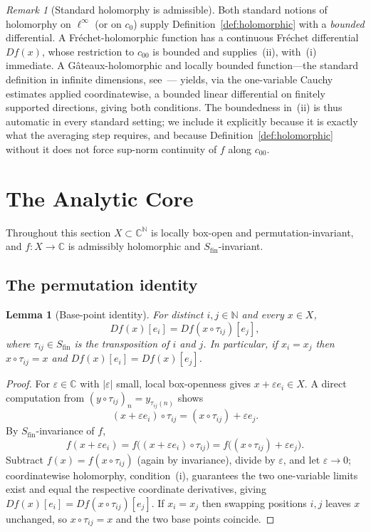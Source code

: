 \documentclass[11pt]{amsart}
\newcommand{\NN}{\mathbb{N}}
\newcommand{\CC}{\mathbb{C}}
\newcommand{\Sfin}{S_{\mathrm{fin}}}
\newcommand{\cc}{c_{00}}
\newcommand{\czero}{c_{0}}
\theoremstyle{plain}
\newtheorem{lemma}[theorem]{Lemma}
\theoremstyle{definition}
\theoremstyle{remark}
\newtheorem{remark}[theorem]{Remark}
\begin{document}
\begin{remark}[Standard holomorphy is admissible]
\label{rem:standard}
Both standard notions of holomorphy on $\ell^\infty$ (or on $\czero$)
supply Definition~\ref{def:holomorphic} with a \emph{bounded} differential.
A Fr\'echet-holomorphic function has a continuous Fr\'echet differential
$Df(x)$, whose restriction to $\cc$ is bounded and supplies~(ii), with~(i)
immediate. A G\^ateaux-holomorphic and locally bounded function---the
standard definition in infinite dimensions, see~\cite{Mujica,Dineen}---
yields, via the one-variable Cauchy estimates applied coordinatewise, a
bounded linear differential on finitely supported directions, giving both
conditions. The boundedness in~(ii) is thus automatic in every standard
setting; we include it explicitly because it is exactly what the averaging
step requires, and because Definition~\ref{def:holomorphic} without it does
not force sup-norm continuity of $f$ along $\cc$.
\end{remark}

\section{The Analytic Core}
\label{sec:core}

Throughout this section $X\subset\CC^\NN$ is locally box-open and
permutation-invariant, and $f:X\to\CC$ is admissibly holomorphic and
$\Sfin$-invariant.

\subsection{The permutation identity}

\begin{lemma}[Base-point identity]
\label{lem:basepoint}
For distinct $i,j\in\NN$ and every $x\in X$,
\[
  Df(x)[e_i] = Df(x\circ\tau_{ij})[e_j],
\]
where $\tau_{ij}\in\Sfin$ is the transposition of $i$ and $j$. In
particular, if $x_i=x_j$ then $x\circ\tau_{ij}=x$ and
$Df(x)[e_i]=Df(x)[e_j]$.
\end{lemma}

\begin{proof}
For $\varepsilon\in\CC$ with $|\varepsilon|$ small, local box-openness
gives $x+\varepsilon e_i\in X$. A direct computation from
$(y\circ\tau_{ij})_n=y_{\tau_{ij}(n)}$ shows
\[
  (x+\varepsilon e_i)\circ\tau_{ij}
  = (x\circ\tau_{ij}) + \varepsilon e_j .
\]
By $\Sfin$-invariance of $f$,
\[
  f(x+\varepsilon e_i)
  = f\bigl((x+\varepsilon e_i)\circ\tau_{ij}\bigr)
  = f\bigl((x\circ\tau_{ij})+\varepsilon e_j\bigr).
\]
Subtract $f(x)=f(x\circ\tau_{ij})$ (again by invariance), divide by
$\varepsilon$, and let $\varepsilon\to0$; coordinatewise holomorphy,
condition~(i), guarantees the two one-variable limits exist and equal the
respective coordinate derivatives, giving
$Df(x)[e_i]=Df(x\circ\tau_{ij})[e_j]$. If $x_i=x_j$ then swapping positions
$i,j$ leaves $x$ unchanged, so $x\circ\tau_{ij}=x$ and the two base points
coincide.
\end{proof}
\end{document}
